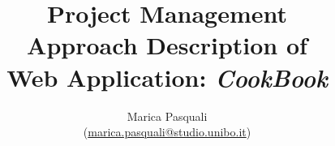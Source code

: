 \documentclass{report}
\title{
    \textbf{
        Project Management \\ 
        Approach Description of \\ 
        Web Application: \textit{CookBook}
    }
}
\author{
    Marica Pasquali \\ 
    (\href{mailto:marica.pasquali@studio.unibo.it}{marica.pasquali@studio.unibo.it})
}
\begin{document}
\maketitle

\listoftodos
\tableofcontents


\newpage

\newpage

\newpage

\newpage

\newpage

\end{document}
